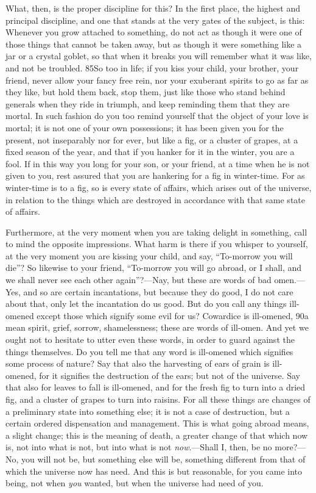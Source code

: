 What, then, is the proper discipline for this? In the first place, the highest and principal discipline, and one that stands at the very gates of the subject, is this: Whenever you grow attached to something, do not act as though it were one of those things that cannot be taken away, but as though it were something like a jar or a crystal goblet, so that when it breaks you will remember what it was like, and not be troubled. 85So too in life; if you kiss your child, your brother, your friend, never allow your fancy free rein, nor your exuberant spirits to go as far as they like, but hold them back, stop them, just like those who stand behind generals when they ride in triumph, and keep reminding them that they are mortal. In such fashion do you too remind yourself that the object of your love is mortal; it is not one of your own possessions; it has been given you for the present, not inseparably nor for ever, but like a fig, or a cluster of grapes, at a fixed season of the year, and that if you hanker for it in the winter, you are a fool. If in this way you long for your son, or your friend, at a time when he is not given to you, rest assured that you are hankering for a fig in winter-time. For as winter-time is to a fig, so is every state of affairs, which arises out of the universe, in relation to the things which are destroyed in accordance with that same state of affairs.

Furthermore, at the very moment when you are taking delight in something, call to mind the opposite impressions. What harm is there if you whisper to yourself, at the very moment you are kissing your child, and say, ``To-morrow you will die''? So likewise to your friend, ``To-morrow you will go abroad, or I shall, and we shall never see each other again''?—Nay, but these are words of bad omen.—Yes, and so are certain incantations, but because they do good, I do not care about that, only let the incantation do us good. But do you call any things ill-omened except those which signify some evil for us? Cowardice is ill-omened, 90a mean spirit, grief, sorrow, shamelessness; these are words of ill-omen. And yet we ought not to hesitate to utter even these words, in order to guard against the things themselves. Do you tell me that any word is ill-omened which signifies some process of nature? Say that also the harvesting of ears of grain is ill-omened, for it signifies the destruction of the ears; but not of the universe. Say that also for leaves to fall is ill-omened, and for the fresh fig to turn into a dried fig, and a cluster of grapes to turn into raisins. For all these things are changes of a preliminary state into something else; it is not a case of destruction, but a certain ordered dispensation and management. This is what going abroad means, a slight change; this is the meaning of death, a greater change of that which now is, not into what is not, but into what is not \emph{now}.—Shall I, then, be no more?—No, you will not be, but something else will be, something different from that of which the universe now has need. And this is but reasonable, for you came into being, not when \emph{you} wanted, but when the universe had need of you.

